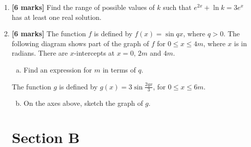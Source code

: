 \documentclass[12pt, twoside]{article}
\begin{document}
\begin{enumerate}
\vspace{1cm}

\item \textbf{[6 marks]} Find the range of possible values of $k$ such that $e^{2x} + \ln k = 3e^x$ has at least one real solution.

\vspace{1cm}

\item \textbf{[6 marks]} The function $f$ is defined by $f(x) = \sin qx$, where $q > 0$. The following diagram shows part of the graph of $f$ for $0 \leq x \leq 4m$, where $x$ is in radians. There are $x$-intercepts at $x = 0$, $2m$ and $4m$.

\begin{center}
\end{center}

    \begin{enumerate}[(a)]
        \item Find an expression for $m$ in terms of $q$.
    \end{enumerate}
    
    The function $g$ is defined by $g(x) = 3\sin\frac{2qx}{3}$, for $0 \leq x \leq 6m$.
    
    \begin{enumerate}[(a)]
        \setcounter{enumii}{1}
        \item On the axes above, sketch the graph of $g$.
    \end{enumerate}

\newpage

\section*{Section B}

\setcounter{enumi}{6}


\end{enumerate}
\end{document}
